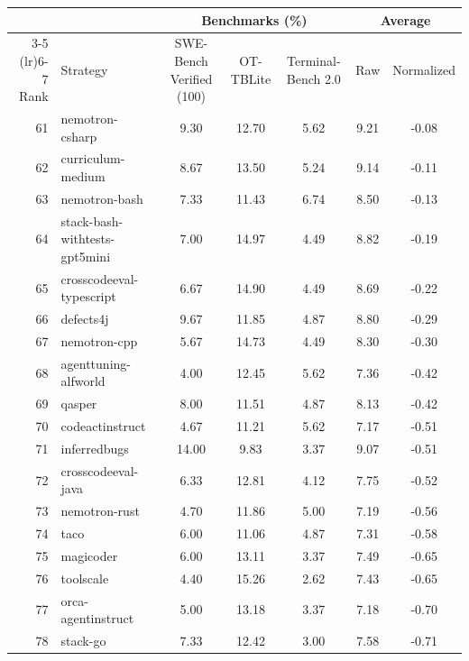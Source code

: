 \documentclass{article}
\begin{document}
\begin{table}[!htbp]
\centering
\footnotesize
\setlength{\tabcolsep}{4pt}
\begin{tabular}{rlccccc}
\toprule
 & & \multicolumn{3}{c}{Benchmarks (\%)} & \multicolumn{2}{c}{Average} \\
\cmidrule(lr){3-5} \cmidrule(lr){6-7}
Rank & Strategy & SWE-Bench Verified (100) & OT-TBLite & Terminal-Bench 2.0 & Raw & Normalized \\
\midrule
61 & nemotron-csharp                &  9.30 & 12.70 &  5.62 &  9.21 & -0.08 \\
62 & curriculum-medium              &  8.67 & 13.50 &  5.24 &  9.14 & -0.11 \\
63 & nemotron-bash                  &  7.33 & 11.43 &  6.74 &  8.50 & -0.13 \\
64 & stack-bash-withtests-gpt5mini  &  7.00 & 14.97 &  4.49 &  8.82 & -0.19 \\
65 & crosscodeeval-typescript       &  6.67 & 14.90 &  4.49 &  8.69 & -0.22 \\
66 & defects4j                      &  9.67 & 11.85 &  4.87 &  8.80 & -0.29 \\
67 & nemotron-cpp                   &  5.67 & 14.73 &  4.49 &  8.30 & -0.30 \\
68 & agenttuning-alfworld           &  4.00 & 12.45 &  5.62 &  7.36 & -0.42 \\
69 & qasper                         &  8.00 & 11.51 &  4.87 &  8.13 & -0.42 \\
70 & codeactinstruct                &  4.67 & 11.21 &  5.62 &  7.17 & -0.51 \\
71 & inferredbugs                   & 14.00 &  9.83 &  3.37 &  9.07 & -0.51 \\
72 & crosscodeeval-java             &  6.33 & 12.81 &  4.12 &  7.75 & -0.52 \\
73 & nemotron-rust                  &  4.70 & 11.86 &  5.00 &  7.19 & -0.56 \\
74 & taco                           &  6.00 & 11.06 &  4.87 &  7.31 & -0.58 \\
75 & magicoder                      &  6.00 & 13.11 &  3.37 &  7.49 & -0.65 \\
76 & toolscale                      &  4.40 & 15.26 &  2.62 &  7.43 & -0.65 \\
77 & orca-agentinstruct             &  5.00 & 13.18 &  3.37 &  7.18 & -0.70 \\
78 & stack-go                       &  7.33 & 12.42 &  3.00 &  7.58 & -0.71 \\

\end{tabular}
\end{table}
\end{document}
